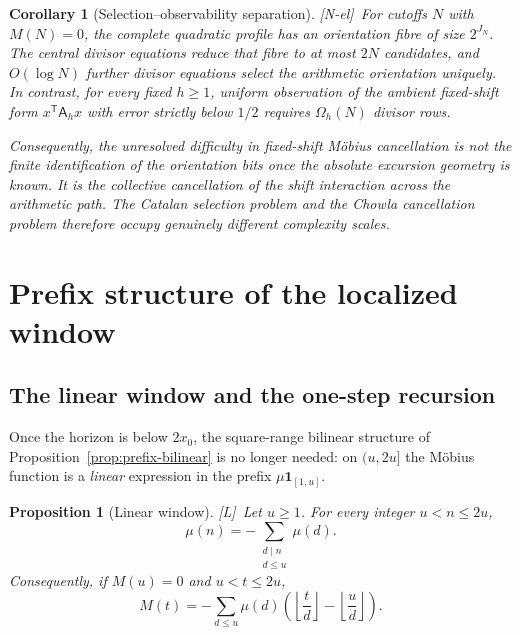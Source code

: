 \documentclass[11pt,reqno]{amsart}
\numberwithin{equation}{section}
\theoremstyle{plain}
\newtheorem{proposition}[theorem]{Proposition}
\newtheorem{corollary}[theorem]{Corollary}
\theoremstyle{definition}
\theoremstyle{remark}
\newcommand{\tagNE}{\textup{[N-el]}}
\newcommand{\tagL}{\textup{[L]}}
\begin{document}
\begin{corollary}[Selection--observability separation]
\label{cor:selection-observability-separation}
\tagNE\ For cutoffs $N$ with $M(N)=0$, the complete quadratic profile has an orientation fibre of size $2^{J_N}$.  The central divisor equations reduce that fibre to at most $2N$ candidates, and $O(\log N)$ further divisor equations select the arithmetic orientation uniquely.  In contrast, for every fixed $h\ge1$, uniform observation of the ambient fixed-shift form $x^{\mathsf T}\mathsf A_hx$ with error strictly below $1/2$ requires $\Omega_h(N)$ divisor rows.

Consequently, the unresolved difficulty in fixed-shift M\"obius cancellation is not the finite identification of the orientation bits once the absolute excursion geometry is known.  It is the collective cancellation of the shift interaction across the arithmetic path.  The Catalan selection problem and the Chowla cancellation problem therefore occupy genuinely different complexity scales.
\end{corollary}


\section{Prefix structure of the localized window}
\label{sec:prefix}

\subsection{The linear window and the one-step recursion}
\label{subsec:linear-window}

Once the horizon is below $2x_0$, the square-range bilinear structure of
Proposition~\ref{prop:prefix-bilinear} is no longer needed: on $(u,2u]$ the
M\"obius function is a \emph{linear} expression in the prefix
$\mu\mathbf 1_{[1,u]}$.

\begin{proposition}[Linear window]
\label{prop:linear-window}
\tagL\ Let $u\ge1$. For every integer $u<n\le2u$,
\begin{equation}
\label{eq:linear-window-mu}
\mu(n)=-\sum_{\substack{d\mid n\\ d\le u}}\mu(d).
\end{equation}
Consequently, if $M(u)=0$ and $u<t\le2u$,
\begin{equation}
\label{eq:linear-window-M}
M(t)=-\sum_{d\le u}\mu(d)\left(\left\lfloor\frac td\right\rfloor
-\left\lfloor\frac ud\right\rfloor\right).
\end{equation}
\end{proposition}
\end{document}
